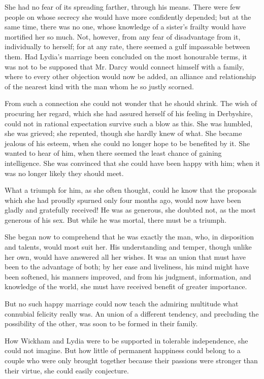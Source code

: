 She had no fear of its spreading farther, through his
means. There were few people on whose secrecy she
would have more confidently depended; but at the same
time, there was no one, whose knowledge of a sister’s
frailty would have mortified her so much. Not, however,
from any fear of disadvantage from it, individually to
herself; for at any rate, there seemed a gulf impassable
between them. Had Lydia’s marriage been concluded on
the most honourable terms, it was not to be supposed
that Mr. Darcy would connect himself with a family,
where to every other objection would now be added, an
alliance and relationship of the nearest kind with the
man whom he so justly scorned.

From such a connection she could not wonder that he
should shrink. The wish of procuring her regard, which
she had assured herself of his feeling in Derbyshire, could
not in rational expectation survive such a blow as this.
She was humbled, she was grieved; she repented, though
she hardly knew of what. She became jealous of his
esteem, when she could no longer hope to be benefited
by it. She wanted to hear of him, when there seemed
the least chance of gaining intelligence. She was convinced
that she could have been happy with him; when it was
no longer likely they should meet.

What a triumph for him, as she often thought, could
he know that the proposals which she had proudly spurned
only four months ago, would now have been gladly and
gratefully received! He was as generous, she doubted not,
as the most generous of his sex. But while he was mortal,
there must be a triumph.

She began now to comprehend that he was exactly the
man, who, in disposition and talents, would most suit her.
His understanding and temper, though unlike her own,
would have answered all her wishes. It was an union that
must have been to the advantage of both; by her ease
and liveliness, his mind might have been softened, his
manners improved, and from his judgment, information,
and knowledge of the world, she must have received
benefit of greater importance.

But no such happy marriage could now teach the
admiring multitude what connubial felicity really was.
An union of a different tendency, and precluding the possibility
of the other, was soon to be formed in their family.

How Wickham and Lydia were to be supported in
tolerable independence, she could not imagine. But how
little of permanent happiness could belong to a couple
who were only brought together because their passions
were stronger than their virtue, she could easily
conjecture.

